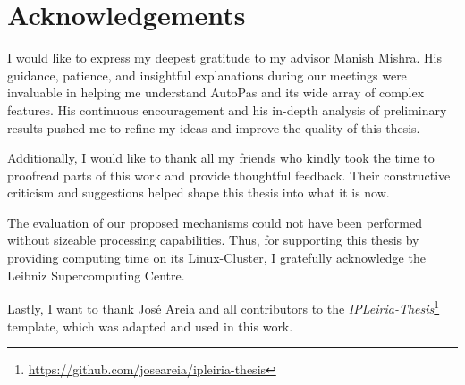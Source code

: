 \chapter*{Acknowledgements}

{
	\setlength\parindent{0pt}
	I would like to express my deepest gratitude to my advisor Manish Mishra. His guidance, patience, and insightful explanations during our meetings were invaluable in helping me understand AutoPas and its wide array of complex features. His continuous encouragement and his in-depth analysis of preliminary results pushed me to refine my ideas and improve the quality of this thesis.
	\vspace*{\baselineskip}
	
	Additionally, I would like to thank all my friends who kindly took the time to proofread parts of this work and provide thoughtful feedback. Their constructive criticism and suggestions helped shape this thesis into what it is now.
	\vspace*{\baselineskip}
	
	The evaluation of our proposed mechanisms could not have been performed without sizeable processing capabilities. Thus, for supporting this thesis by providing computing time on its Linux-Cluster, I gratefully acknowledge the Leibniz Supercomputing Centre.
	\vspace*{\baselineskip}
	
	Lastly, I want to thank José Areia and all contributors to the \textit{IPLeiria-Thesis}\footnote{\href{https://github.com/joseareia/ipleiria-thesis}{https://github.com/joseareia/ipleiria-thesis}} template, which was adapted and used in this work.
}


\MediaOptionLogicBlank
